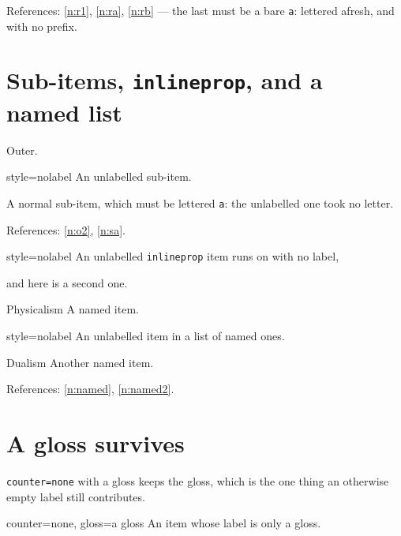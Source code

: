 \documentclass{article}
\begin{document}
References: \ref{n:r1}, \ref{n:ra}, \ref{n:rb} --- the last must be a bare
\texttt{a}: lettered afresh, and with no prefix.

\section{Sub-items, \texttt{inlineprop}, and a named list}

\begin{prop}
  \item Outer. \label{n:o2}
  \begin{prop}
    \item[style=nolabel] An unlabelled sub-item.
    \item A normal sub-item, which must be lettered \texttt{a}: the unlabelled
      one took no letter. \label{n:sa}
  \end{prop}
\end{prop}

References: \ref{n:o2}, \ref{n:sa}.

\begin{inlineprop}
  \item[style=nolabel] An unlabelled \texttt{inlineprop} item runs on with no
    label,
  \item and here is a second one.
\end{inlineprop}

\begin{prop}
  \item[Physicalism] A named item. \label{n:named}
  \item[style=nolabel] An unlabelled item in a list of named ones.
  \item[Dualism] Another named item. \label{n:named2}
\end{prop}

References: \ref{n:named}, \ref{n:named2}.

\section{A gloss survives}

\texttt{counter=none} with a gloss keeps the gloss, which is the one thing an
otherwise empty label still contributes.

\begin{prop}
  \item[counter=none, gloss=a gloss] An item whose label is only a gloss.
\end{prop}
\end{document}
